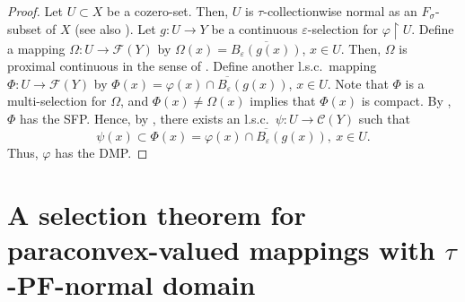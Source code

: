 \documentclass[12pt,a4paper,fleqn,leqno]{amsart}
\theoremstyle{plain}
\theoremstyle{definition}
\numberwithin{equation}{section}
\begin{document}
\begin{proof}
Let $U\subset X$ be a cozero-set. Then, $U$ is $\tau$-collectionwise normal as an $F_{\sigma}$-subset of $X$ \cite{sediva} (see also \cite[Problem 5.5.1 (b)]{Engelking}). Let $g:U\to Y$ be a continuous $\varepsilon$-selection for $\varphi\operatorname{\upharpoonright} U$. Define a mapping $\Omega:U\to\mathscr{F}(Y)$ by $\Omega(x)=\overline{B_{\varepsilon}(g(x))}$, $x\in U$. Then, $\Omega$ is proximal continuous in the sense of \cite{gutev}. Define another l.s.c.\ mapping $\Phi:U\to\mathscr{F}(Y)$ by $\Phi(x)=\overline{\varphi(x)\cap B_{\varepsilon}(g(x))}$, $x\in U$. Note that $\Phi$ is a multi-selection for $\Omega$, and $\Phi(x)\neq\Omega(x)$ implies that $\Phi(x)$ is compact. By \cite[Lemma 4.2]{gutev-al}, $\Phi$ has the SFP. Hence, by \cite[Proposition 4.1]{nedev}, there exists an l.s.c.\ $\psi:U\to\mathscr{C}(Y)$ such that
\[
\psi(x)\subset\Phi(x)=\overline{\varphi(x)\cap B_{\varepsilon}(g(x))},\ x\in U.
\]
Thus, $\varphi$ has the DMP.
\end{proof}

\section{A selection theorem for paraconvex-valued mappings with $\tau$-PF-normal domain}
\label{dmp-sel-thm}
\end{document}
